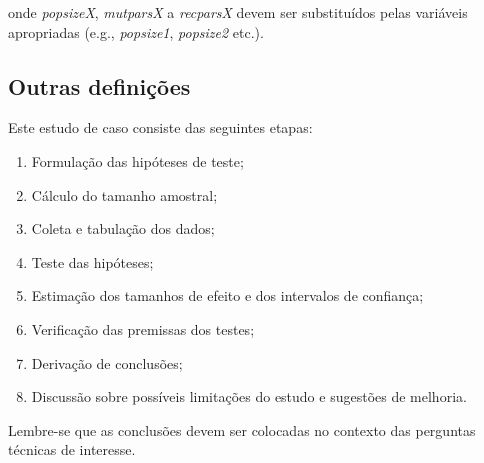 \documentclass[11pt,twoside,printwatermark=false]{pinp}
\providecommand{\tightlist}{%
  \setlength{\itemsep}{0pt}\setlength{\parskip}{0pt}}
\begin{document}
\begin{Shaded}
\begin{Highlighting}[]
\StringTok{ }\NormalTok{(}
              \NormalTok{(} \NormalTok{,}
                              \NormalTok{))}

\OperatorTok{$}
\end{Highlighting}
\end{Shaded}

\noindent onde \emph{popsizeX}, \emph{mutparsX} a \emph{recparsX} devem
ser substituídos pelas variáveis apropriadas (e.g., \emph{popsize1},
\emph{popsize2} etc.).

\subsection{Outras definições}\label{outras-definicoes}

Este estudo de caso consiste das seguintes etapas:

\begin{enumerate}
\def\labelenumi{\arabic{enumi}.}
\tightlist
\item
  Formulação das hipóteses de teste;
\item
  Cálculo do tamanho amostral;
\item
  Coleta e tabulação dos dados;
\item
  Teste das hipóteses;
\item
  Estimação dos tamanhos de efeito e dos intervalos de confiança;
\item
  Verificação das premissas dos testes;
\item
  Derivação de conclusões;
\item
  Discussão sobre possíveis limitações do estudo e sugestões de
  melhoria.
\end{enumerate}

Lembre-se que as conclusões devem ser colocadas no contexto das
perguntas técnicas de interesse.
\end{document}
